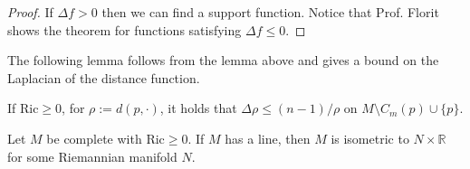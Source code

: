 \begin{proof}
If $\Delta f>0$ then we can find a support function. Notice that Prof. Florit
shows the theorem for functions satisfying $\Delta f \leq 0$.
\end{proof}

The following lemma follows from the lemma above and gives a bound on the
Laplacian of the distance function.

\begin{lemma}[Calabi]
\label{lemma-Calabi}
If $\text{Ric} \geq 0$, for $\rho:=d(p,\cdot)$, it holds that 
$\Delta\rho \leq (n-1)/\rho$ on $M\setminus C_m(p)\cup\{p\}$.
\end{lemma}


\begin{theorem}
\label{theorem-splitting}
Let $M$ be complete with  $\text{Ric}\geq0$. If $M$ has a line, then $M$ is
isometric to $N\times\mathbb{R}$ for some Riemannian manifold $N$.
\end{theorem}



\clearpage




